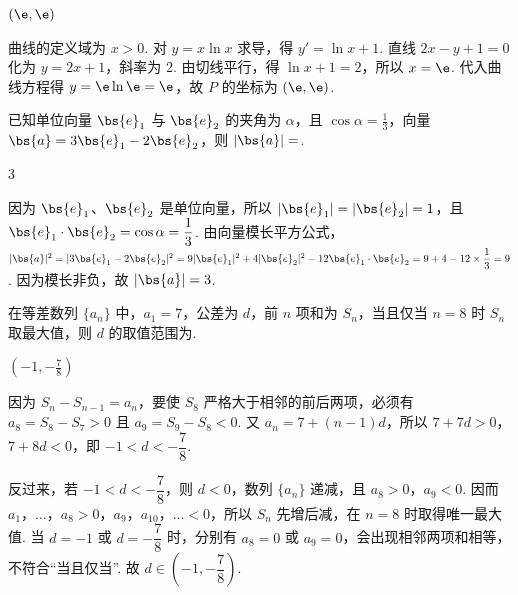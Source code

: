 \begin{answer}
\(\left(\e,\e\right)\)
\end{answer}

\begin{solution}
曲线的定义域为 \(x>0\). 对 \(y=x\ln x\) 求导，得 \(y'=\ln x+1\). 直线 \(2x-y+1=0\) 化为 \(y=2x+1\)，斜率为 2. 由切线平行，得 \(\ln x+1=2\)，所以 \(x=\e\). 代入曲线方程得 \(y=\e\ln\e=\e\)，故 \(P\) 的坐标为 \(\left(\e,\e\right)\).
\end{solution}

\begin{problem}
已知单位向量 \(\bs{e}_1\) 与 \(\bs{e}_2\) 的夹角为 \(\alpha\)，且 \(\cos \alpha = \frac{1}{3}\)，向量 \(\bs{a} = 3\bs{e}_1 - 2\bs{e}_2\)，则 \(|\bs{a}| = \)\fillinblank{}.
\end{problem}

\begin{answer}
\(3\)
\end{answer}

\begin{solution}
因为 \(\bs{e}_1\)、\(\bs{e}_2\) 是单位向量，所以 \(\lvert\bs{e}_1\rvert=\lvert\bs{e}_2\rvert=1\)，且 \(\bs{e}_1\mathbin{\cdot}\bs{e}_2=\cos\alpha=\dfrac13\). 由向量模长平方公式，
\(\lvert\bs{a}\rvert^2=\lvert3\bs{e}_1-2\bs{e}_2\rvert^2=9\lvert\bs{e}_1\rvert^2+4\lvert\bs{e}_2\rvert^2-12\bs{e}_1\mathbin{\cdot}\bs{e}_2=9+4-12\times\dfrac13=9\). 因为模长非负，故 \(\lvert\bs{a}\rvert=3\).
\end{solution}

\begin{problem}
在等差数列 \(\{a_{n}\}\) 中，\(a_{1} = 7\)，公差为 \(d\)，前 \(n\) 项和为 \(S_{n}\)，当且仅当 \(n = 8\) 时 \(S_{n}\) 取最大值，则 \(d\) 的取值范围为\fillinblank{}.
\end{problem}

\begin{answer}
\(\left(-1,-\frac{7}{8}\right)\)
\end{answer}

\begin{solution}
因为 \(S_n-S_{n-1}=a_n\)，要使 \(S_8\) 严格大于相邻的前后两项，必须有 \(a_8=S_8-S_7>0\) 且 \(a_9=S_9-S_8<0\). 又 \(a_n=7+(n-1)d\)，所以
\(7+7d>0\)，\(7+8d<0\)，即 \(-1<d<-\dfrac78\).

反过来，若 \(-1<d<-\dfrac78\)，则 \(d<0\)，数列 \(\{a_n\}\) 递减，且 \(a_8>0\)，\(a_9<0\). 因而 \(a_1\)，\(\ldots\)，\(a_8>0\)，\(a_9\)，\(a_{10}\)，\(\ldots<0\)，所以 \(S_n\) 先增后减，在 \(n=8\) 时取得唯一最大值. 当 \(d=-1\) 或 \(d=-\dfrac78\) 时，分别有 \(a_8=0\) 或 \(a_9=0\)，会出现相邻两项和相等，不符合“当且仅当”. 故 \(d\in\left(-1,-\dfrac78\right)\).
\end{solution}

